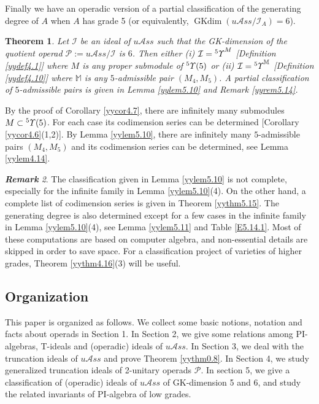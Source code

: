 \documentclass{amsart}
\newtheorem{thm}{Theorem}[section]
\theoremstyle{definition}
\theoremstyle{remark}
\newtheorem{rmk}[thm]{\bf Remark}
\numberwithin{equation}{section}
\newcommand{\up}[1]{{^{#1}{\it \!\Upsilon}}}
\newcommand{\upa}[1]{{^{#1}{\it \!\Upsilon}}}
\def \uas{u\mathcal{A}ss}
\def \I{\mathcal{I}}
\def \ip{{\mathcal{P}}}
\def\gkdim{\operatorname{GKdim}}
\begin{document}
Finally we have an operadic version of a partial classification of 
the generating degree of $A$ when $A$ has grade 5 (or equivalently, 
$\gkdim (\uas/\I_{A})=6$).

\begin{thm}
\label{yythm0.10}
Let $\I$ be an ideal of $\uas$ such that the 
GK-dimension of the quotient operad $\ip:=\uas/\I$ is $6$. 
Then either {\rm{(i)}} $\I=\up{5}^M$ 
{\rm{[Definition \ref{yydef4.1}]}} where $M$ is any
proper submodule of $\up{5}(5)$ or {\rm{(ii)}} 
$\I=\upa{5}^{\mathbb M}$ {\rm{[Definition \ref{yydef4.10}]}} 
where ${\mathbb M}$ is any $5$-admissible pair $(M_4,M_5)$. 
A partial classification of $5$-admissible pairs is given 
in Lemma {\rm{\ref{yylem5.10}}} and Remark {\rm{\ref{yyrem5.14}}}.
\end{thm}

By the proof of Corollary \ref{yycor4.7}, there are 
infinitely many submodules $M\subset \up{5}(5)$. For 
each case its codimension series can be determined
[Corollary \ref{yycor4.6}(1,2)]. By Lemma \ref{yylem5.10}, 
there are infinitely many $5$-admissible pairs $(M_4,M_5)$ 
and its codimension series can be determined, see Lemma 
\ref{yylem4.14}. 


\begin{rmk}
\label{yyrem0.11}
The classification given in Lemma \ref{yylem5.10} is not 
complete, especially for the infinite family in Lemma 
\ref{yylem5.10}(4). On the other hand, a complete list of 
codimension series is given in Theorem \ref{yythm5.15}.
The generating degree is also determined except for a 
few cases in the infinite family in Lemma 
\ref{yylem5.10}(4), see Lemma \ref{yylem5.11} and 
Table \eqref{E5.14.1}. Most of these computations are based on computer algebra, and 
non-essential details are skipped in order to save space. 
For a classification project of varieties of higher grades,
Theorem \ref{yythm4.16}(3) will be useful. 
\end{rmk}

\subsection{Organization}
\label{yysec0.9}
This paper is organized as follows. We collect some 
basic notions, notation and facts about operads in 
Section 1. In Section 2, we give some relations among 
PI-algebras, T-ideals and (operadic) ideals of $\uas$. 
In Section 3, we deal with the truncation ideals of $\uas$
and prove Theorem \ref{yythm0.8}. In Section 4, we study 
generalized truncation ideals of 2-unitary operads $\ip$. 
In section 5, we give a classification of (operadic) 
ideals of $\uas$ of GK-dimension 5 and 6, and study the 
related invariants of PI-algebra of low grades. 
\end{document}
